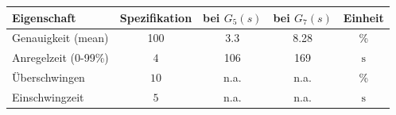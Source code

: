 \begin{table}[h!]
	\centering
	\begin{tabular}{l c c c c}
		Eigenschaft
			& Spezifikation
			& bei $G_5(s)$
			& bei $G_7(s)$
			& Einheit \\
		\hline
		Genauigkeit (mean)
			& 100
			& 3.3
			& 8.28
			& \% \\
		Anregelzeit (0-99\%)
			& $4$
			& 106
			& 169
			& $\si{\second}$ \\
		Überschwingen
			& $10$
			& n.a.
			& n.a.
			& \% \\
		Einschwingzeit
			& $5$
			& n.a. 
			& n.a.
			& $\si{\second}$ \\
	\end{tabular}
\end{table}
